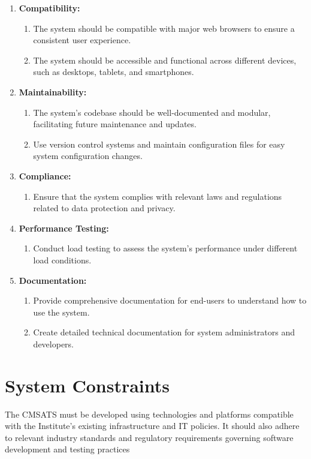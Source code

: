 \begin{enumerate}
    \item \textbf{Compatibility: }
    \begin{enumerate}
        \item The system should be compatible with major web browsers to ensure a consistent user experience.
        \item The system should be accessible and functional across different devices, such as desktops, tablets, and smartphones.
    \end{enumerate}

    \item \textbf{Maintainability: }
    \begin{enumerate}
        \item The system's codebase should be well-documented and modular, facilitating future maintenance and updates.
        \item Use version control systems and maintain configuration files for easy system configuration changes.
    \end{enumerate}
\newpage

    \item \textbf{Compliance: }
    \begin{enumerate}
        \item Ensure that the system complies with relevant laws and regulations related to data protection and privacy.
    \end{enumerate}


\item \textbf{Performance Testing: }
\begin{enumerate}
    \item Conduct load testing to assess the system's performance under different load conditions.
\end{enumerate}

\item \textbf{Documentation: }
\begin{enumerate}
    \item Provide comprehensive documentation for end-users to understand how to use the system.
    \item Create detailed technical documentation for system administrators and developers.
\end{enumerate}

\end{enumerate}

\section{System Constraints}
The CMSATS must be developed using technologies and platforms compatible with the Institute's existing infrastructure and IT policies. It should also adhere to relevant industry standards and regulatory requirements governing software development and testing practices
\vspace{1em} 

